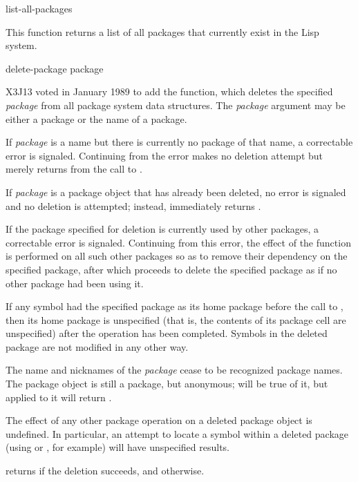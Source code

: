 \begin{defun}[Function]
list-all-packages 

This function returns a list of all packages that currently exist in the
Lisp system.
\end{defun}


\begin{new}
\begin{defun}[Function]
delete-package package

X3J13 voted in January 1989
to add the  function, which
deletes the specified {\it package} from all package system data structures.
The {\it package} argument may be either a package or the name of a package.

If {\it package} is a name but there is currently no package of that name,
a correctable error is signaled.  Continuing from the error makes
no deletion attempt but merely returns  from the call to
.

If {\it package} is a package object that has already been deleted,
no error is signaled and no deletion is attempted; instead,
 immediately returns .

If the package specified for deletion is currently used by other packages,
a correctable error is signaled.  Continuing from this error,
the effect of the function  is performed on all
such other packages so as to remove their dependency on the
specified package, after which  proceeds to
delete the specified package as if no other package had been using it.

If any symbol had the specified package as its home package before
the call to , then its home package is unspecified
(that is, the contents of its package cell are unspecified)
after the  operation has been completed.
Symbols in the deleted package are not modified in any other way.

The name and nicknames of the {\it package} cease to be recognized package
names.  The package object is still a package, but anonymous;  will
be true of it, but  applied to it will return .

The effect of any other package operation on a deleted package object
is undefined.  In particular, an attempt to locate a symbol within a
deleted package (using  or , for example)
will have unspecified results.

 returns  if the deletion succeeds,
and  otherwise.
\end{defun}
\end{new}

